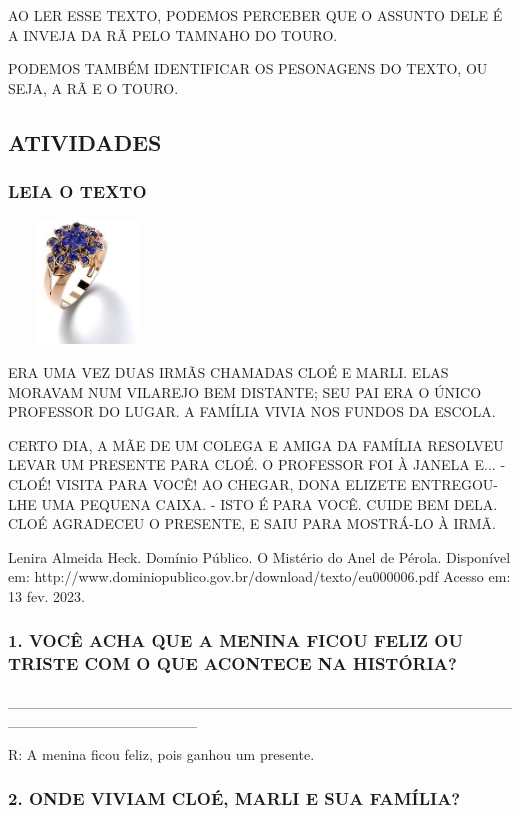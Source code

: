 AO LER ESSE TEXTO, PODEMOS PERCEBER QUE O ASSUNTO DELE É A INVEJA DA RÃ
PELO TAMNAHO DO TOURO.

PODEMOS TAMBÉM IDENTIFICAR OS PESONAGENS DO TEXTO, OU SEJA, A RÃ E O
TOURO.\protect\hypertarget{_heading=h.nmjmay4k137u}{}{}

\subsection{ATIVIDADES}\label{atividades-4}

\subsubsection{LEIA O TEXTO}\label{leia-o-texto-1}

\includegraphics[width=1.66667in,height=1.30208in]{media/image163.jpg}

ERA UMA VEZ DUAS IRMÃS CHAMADAS CLOÉ E MARLI. ELAS MORAVAM NUM VILAREJO
BEM DISTANTE; SEU PAI ERA O ÚNICO PROFESSOR DO LUGAR. A FAMÍLIA VIVIA
NOS FUNDOS DA ESCOLA.

CERTO DIA, A MÃE DE UM COLEGA E AMIGA DA FAMÍLIA RESOLVEU LEVAR UM
PRESENTE PARA CLOÉ. O PROFESSOR FOI À JANELA E... 
- CLOÉ! VISITA PARA VOCÊ! 
AO CHEGAR, DONA ELIZETE ENTREGOU-LHE UMA PEQUENA CAIXA. 
- ISTO É PARA VOCÊ. CUIDE BEM DELA. 
CLOÉ AGRADECEU O PRESENTE, E SAIU PARA MOSTRÁ-LO À IRMÃ.

Lenira Almeida Heck. Domínio Público. O Mistério do Anel de Pérola. Disponível em:
http://www.dominiopublico.gov.br/download/texto/eu000006.pdf
Acesso em: 13 fev. 2023.

\subsubsection{1. VOCÊ ACHA QUE A MENINA FICOU FELIZ OU TRISTE COM O QUE ACONTECE NA HISTÓRIA?}

\_\_\_\_\_\_\_\_\_\_\_\_\_\_\_\_\_\_\_\_\_\_\_\_\_\_\_\_\_\_\_\_\_\_\_\_\_\_\_\_\_\_\_\_\_\_\_\_\_\_\_\_\_\_\_\_\_\_\_\_\_\_\_\_\_\_

R: A menina ficou feliz, pois ganhou um presente.

\subsubsection{2. ONDE VIVIAM CLOÉ, MARLI E SUA
FAMÍLIA?}\label{onde-viviam-clouxe9-marli-e-sua-famuxedlia}

